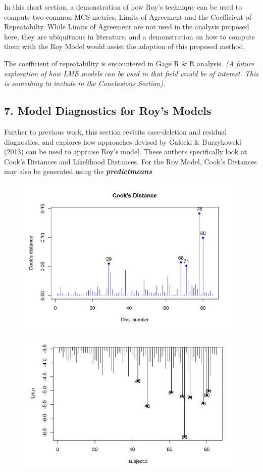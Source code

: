 \documentclass[Main.tex]{subfiles}
\begin{document}
In this short section, a demonstration of how Roy's technique can be used to compute two common MCS metrics: Limits of Agreement and the Coefficient of Repeatabilty. While Limits of Agreement are not used in the analysis proposed here, they are ubiquituous in literature, and a demonstration on how to compute them with the Roy Model would assist the adoption of this proposed method.

The coefficient of repeatability is encountered in Gage R \& R analysis. \textit{(A future exploration of how LME models can be used in that field would be of interest. This is something to include in the Conclusions Section).}
\subsection*{7. Model Diagnostics for Roy's Models}

Further to previous work, this section revisits case-deletion and residual diagnostics, and explores how approaches devised by  Galecki \& Burzykowski (2013) can be used to appraise Roy's model. These authors specifically look at Cook's Distances and Likelihood Distances.
For the Roy Model, Cook's Distances may also be generated using the \textbf{\textit{predictmeans}}



\begin{figure}[h!]
\centering
\includegraphics[width=0.7\linewidth]{images/CooksDistancePlot-JS-Roy}
\caption{}
\label{fig:CooksDistancePlot-JS-Roy}
\end{figure}

\begin{figure}[h!]
\centering
\includegraphics[width=0.7\linewidth]{images/LogLik-JS-Roy}
\caption{}
\label{fig:LogLik-JS-Roy}
\end{figure}
\end{document}
